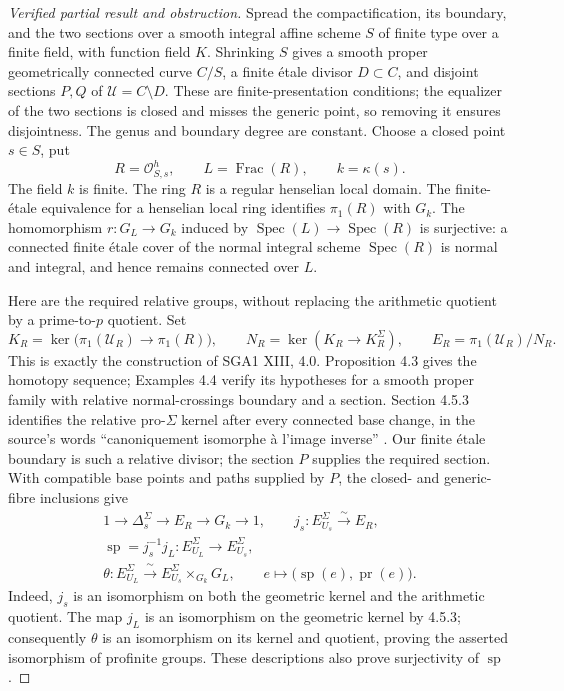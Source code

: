 \begin{proof}[Verified partial result and obstruction]
Spread the compactification, its boundary, and the two sections over
a smooth integral affine scheme $S$ of finite type over a finite
field, with function field $K$. Shrinking $S$ gives a smooth proper
geometrically connected curve $C/S$, a finite \'etale divisor
$D\subset C$, and disjoint sections $P,Q$ of $\mathcal U=C\setminus D$.
These are finite-presentation conditions; the equalizer of the two
sections is closed and misses the generic point, so removing it
ensures disjointness. The genus and boundary degree are constant.
Choose a closed point $s\in S$, put
\[
 R=\mathcal O_{S,s}^{h},\qquad L=\operatorname{Frac}(R),
 \qquad k=\kappa(s).
\]
The field $k$ is finite. The ring $R$ is a regular henselian local
domain. The finite-\'etale equivalence for a henselian local ring
identifies $\pi_1(R)$ with $G_k$\cite[Tag 09ZS]{AB_Stacks}.
The homomorphism $r:G_L\to G_k$ induced by
$\operatorname{Spec}(L)\to\operatorname{Spec}(R)$ is surjective:
a connected finite \'etale cover of the normal integral scheme
$\operatorname{Spec}(R)$ is normal and integral, and hence remains
connected over $L$.

Here are the required relative groups, without replacing the
arithmetic quotient by a prime-to-$p$ quotient. Set
\[
 K_R=\ker\bigl(\pi_1(\mathcal U_R)\to\pi_1(R)\bigr),\qquad
 N_R=\ker(K_R\to K_R^\Sigma),\qquad
 E_R=\pi_1(\mathcal U_R)/N_R.
\]
This is exactly the construction of SGA1 XIII, 4.0.
Proposition 4.3 gives the homotopy sequence; Examples 4.4 verify
its hypotheses for a smooth proper family with relative
normal-crossings boundary and a section. Section 4.5.3 identifies
the relative pro-$\Sigma$ kernel after every connected base change,
in the source's words ``canoniquement isomorphe \`a l'image inverse''
\cite[Expos\'e XIII, 4.0, Proposition 4.3, Examples 4.4, 4.5.3]{SGA1}.
Our finite \'etale boundary is such a relative divisor; the section
$P$ supplies the required section. With compatible base points and
paths supplied by $P$, the closed- and generic-fibre inclusions give
\[
 \begin{gathered}
 1\longrightarrow\Delta_s^\Sigma\longrightarrow E_R
   \longrightarrow G_k\longrightarrow1,\qquad
 j_s:E_{U_s}^{\Sigma}\xrightarrow{\ \sim\ }E_R,\\
 \operatorname{sp}=j_s^{-1}j_L:E_{U_L}^{\Sigma}
   \longrightarrow E_{U_s}^{\Sigma},\\
 \theta:E_{U_L}^{\Sigma}\xrightarrow{\ \sim\ }
 E_{U_s}^{\Sigma}\times_{G_k}G_L,
 \qquad e\longmapsto\bigl(\operatorname{sp}(e),\operatorname{pr}(e)\bigr).
 \end{gathered}
\]
Indeed, $j_s$ is an isomorphism on both the geometric kernel and
the arithmetic quotient. The map $j_L$ is an isomorphism on the
geometric kernel by 4.5.3; consequently $\theta$ is an isomorphism
on its kernel and quotient, proving the asserted isomorphism of
profinite groups. These descriptions also prove surjectivity of
$\operatorname{sp}$.


\end{proof}
